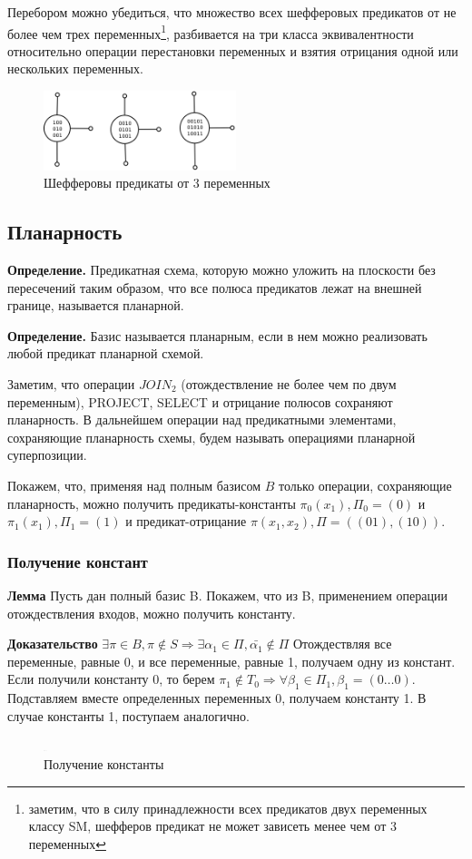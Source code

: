 \documentclass[12pt]{article}
\begin{document}
Перебором можно убедиться, что множество всех шефферовых предикатов от не более чем трех переменных\footnote{
заметим, что в силу принадлежности всех предикатов двух переменных классу SM, шефферов предикат не может зависеть
менее чем от 3 переменных}, 
разбивается на три класса эквивалентности относительно операции
перестановки переменных и взятия отрицания одной или нескольких переменных. 

\begin{figure}[htb]
\centering
\includegraphics[width=0.5\textwidth]{scheff3.png}
\caption{Шефферовы предикаты от 3 переменных}
\label{fig:sheff}
\end{figure}


\subsection{Планарность}
\textbf{Определение.} 
Предикатная схема, которую можно уложить на плоскости без пересечений таким образом, что
все полюса предикатов лежат на внешней границе, называется планарной. 

\textbf{Определение.} Базис называется планарным, если в нем можно реализовать любой предикат планарной схемой.

Заметим, что операции $JOIN_2$ (отождествление не более чем по двум переменным), PROJECT, SELECT и отрицание полюсов
сохраняют планарность. В дальнейшем операции над предикатными элементами, сохраняющие планарность схемы,
будем называть операциями планарной суперпозиции.

Покажем, что, применяя над полным базисом $B$ только операции, сохраняющие планарность, можно получить предикаты-константы
$\pi_0(x_1), \Pi_0=(0)$ и $\pi_1(x_1), \Pi_1=(1)$ и предикат-отрицание $\pi(x_1, x_2), \Pi=( (01), (10) )$.

\subsubsection{Получение констант}
\textbf{Лемма} Пусть дан полный базис B. Покажем, что из B, применением операции отождествления входов,
можно получить константу.

\textbf{Доказательство} $\exists \pi \in B, \pi \notin S \Rightarrow \exists \alpha_1 \in \Pi, \bar{\alpha_1} \notin \Pi$
Отождествляя все переменные, равные 0, и все переменные, равные 1, получаем одну из констант.
Если получили константу 0, то берем $\pi_1 \notin T_0 \Rightarrow \forall \beta_1 \in \Pi_1, \beta_1=(0 \ldots 0)$. 
Подставляем вместе определенных переменных 0, получаем константу 1. 
В случае константы 1, поступаем аналогично.
\begin{figure}[htb]
\centering
\includegraphics[width=0.01\textwidth]{3_2to3.png}
\caption{Получение константы}
\label{fig:constant}
\end{figure}
\end{document}
